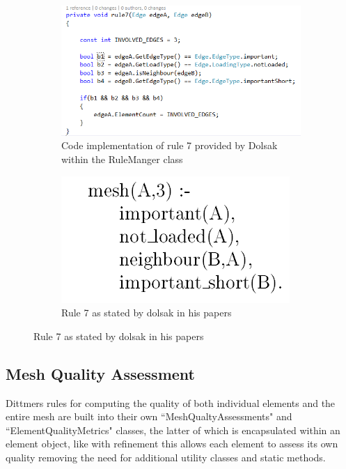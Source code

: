 \begin{figure}[!h]
\centering
\begin{subfigure}{.5\textwidth}
  \centering
  \includegraphics[width=0.9\linewidth]{../Graphics/Rule7Implementation.png}
  \caption{Code implementation of rule 7 provided by Dolsak within the RuleManger class}
  \label{fig:sub1}
\end{subfigure}%
\begin{subfigure}{.5\textwidth}
  \centering
  \includegraphics[width=0.7\linewidth]{../Graphics/Rule7Dolsak.png}
  \caption{Rule 7 as stated by dolsak in his papers \cite{appOfILPToFEMeshDesign}}
  \label{fig:sub2}
\end{subfigure}
\label{fig:test}
\end{figure}


\subsection{Mesh Quality Assessment}
Dittmers rules for computing the quality of both individual elements and the entire mesh are built into their own ``MeshQualtyAssessments" and ``ElementQualityMetrics" classes, the latter of which is encapsulated within an element object, like with refinement this allows each element to assess its own quality removing the need for additional utility classes and static methods. \\

